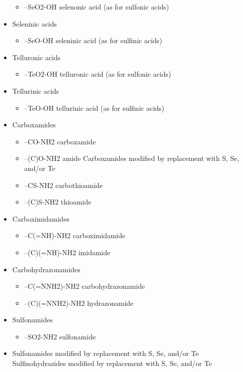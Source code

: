 \documentclass[a4paper,12pt]{report}
\begin{document}
\begin{itemize}
\begin{itemize}
\item –SeO2-OH selenonic acid (as for sulfonic acids) 
\end{itemize}
\item Seleninic acids 
\begin{itemize}
\item –SeO-OH seleninic acid (as for sulfinic acids) 
\end{itemize}
\item Telluronic acids 
\begin{itemize}
\item –TeO2-OH telluronic acid (as for sulfonic acids) 
\end{itemize}
\item Tellurinic acids 
\begin{itemize}
\item –TeO-OH tellurinic acid (as for sulfinic acids) 
\end{itemize}
\item Carboxamides 
\begin{itemize}
\item –CO-NH2 carboxamide 
\item –(C)O-NH2 amide Carboxamides modified by replacement with S, Se, and/or Te 
\item –CS-NH2 carbothioamide 
\item –(C)S-NH2 thioamide 
\end{itemize}
\item Carboximidamides 
\begin{itemize}
\item –C(=NH)-NH2 carboximidamide 
\item –(C)(=NH)-NH2 imidamide 
\end{itemize}
\item Carbohydrazonamides 
\begin{itemize}
\item –C(=NNH2)-NH2 carbohydrazonamide 
\item –(C)(=NNH2)-NH2 hydrazonamide 
\end{itemize}
\item Sulfonamides 
\begin{itemize}
\item –SO2-NH2 sulfonamide 
\end{itemize}
\item Sulfonamides modified by replacement with S, Se, and/or Te Sulfinohydrazides modified by replacement with S, Se, and/or Te 
\begin{itemize}

\end{itemize}
\end{itemize}
\end{document}
